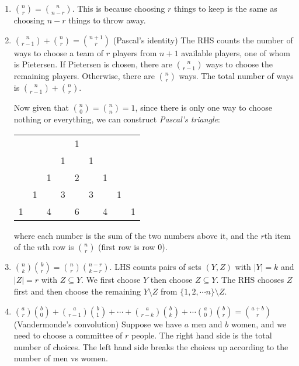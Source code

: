 \documentclass[a4paper]{article}
\begin{document}
  \begin{prop}\leavevmode
    \begin{enumerate}
      \item $\displaystyle{n\choose r} = {n\choose n - r}$. This is because choosing $r$ things to keep is the same as choosing $n - r$ things to throw away.
      \item $\displaystyle{n \choose r - 1} + {n\choose r} = {n + 1\choose r}$ (Pascal's identity) The RHS counts the number of ways to choose a team of $r$ players from $n + 1$ available players, one of whom is Pietersen. If Pietersen is chosen, there are ${n\choose r - 1}$ ways to choose the remaining players. Otherwise, there are ${n\choose r}$ ways. The total number of ways is ${n\choose r - 1} + {n\choose r}$.

        Now given that ${n\choose 0} ={n\choose n}= 1$, since there is only one way to choose nothing or everything, we can construct \emph{Pascal's triangle}:
        \begin{center}
          \begin{tabular}{lllllllll}
            &   &   &   & 1 &   &   &   &   \\
            &   &   & 1 &   & 1 &   &   &   \\
            &   & 1 &   & 2 &   & 1 &   &   \\
            & 1 &   & 3 &   & 3 &   & 1 &   \\
            1 &   & 4 &   & 6 &   & 4 &   & 1 \\
          \end{tabular}
        \end{center}
        where each number is the sum of the two numbers above it, and the $r$th item of the $n$th row is ${n\choose r}$ (first row is row $0$).
      \item $\displaystyle{n \choose k}{k \choose r} = {n\choose r}{n - r\choose k - r}$. LHS counts pairs of sets $(Y, Z)$ with $|Y| = k$ and $|Z| = r$ with $Z\subseteq Y$. We first choose $Y$ then choose $Z\subseteq Y$. The RHS chooses $Z$ first and then choose the remaining $Y\setminus Z$ from $\{1, 2, \cdots n\}\setminus Z$.
      \item $\displaystyle {a\choose r}{b\choose 0} + {a\choose r - 1}{b\choose 1} + \cdots + {a \choose r - k}{b\choose k} + \cdots {a\choose 0}{b\choose r} = {a + b\choose r}$ (Vandermonde's convolution) Suppose we have $a$ men and $b$ women, and we need to choose a committee of $r$ people. The right hand side is the total number of choices. The left hand side breaks the choices up according to the number of men vs women.
    \end{enumerate}
  \end{prop}
\end{document}
